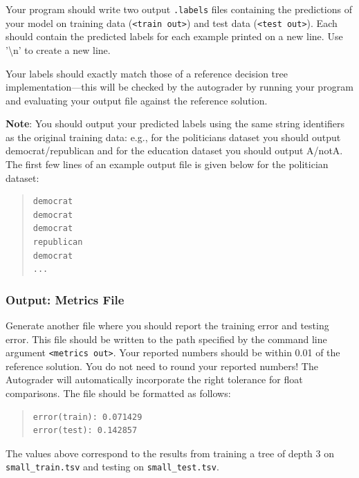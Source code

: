 \documentclass[11pt]{article}
\numberwithin{equation}{section} %
\numberwithin{figure}{section} %
\numberwithin{table}{section} %
\begin{document}
Your program should write two output \lstinline{.labels} files containing the predictions of your model on training data (\lstinline{<train out>}) and test data (\lstinline{<test out>}). Each should contain the predicted labels for each example printed on a new line. Use '\textbackslash n' to create a new line.

Your labels should exactly match those of a reference decision tree implementation---this will be checked by the autograder by running your program and evaluating your output file against the reference solution.

\textbf{Note}: You should output your predicted labels using the same string identifiers as the original training data: e.g., for the politicians dataset you should output democrat/republican and for the education dataset you should output A/notA.
%
The first few lines of an example output file is given below for the politician dataset:
\begin{quote}
\begin{verbatim}
democrat
democrat
democrat
republican
democrat
...
\end{verbatim}
\end{quote}

\subsubsection{Output: Metrics File}
\label{sec:metrics}

Generate another file where you should report the training error and testing error. This file should be written to the path specified by the command line argument \lstinline{<metrics out>}. Your reported numbers should be within 0.01 of the reference solution. You do not need to round your reported numbers! The Autograder will automatically incorporate the right tolerance for float comparisons. The file should be formatted as follows:

\begin{quote}
\begin{verbatim}
error(train): 0.071429
error(test): 0.142857
\end{verbatim}
\end{quote}

The values above correspond to the results from training a tree of depth 3 on \texttt{small\_train.tsv} and testing on \texttt{small\_test.tsv}.

\end{document}
